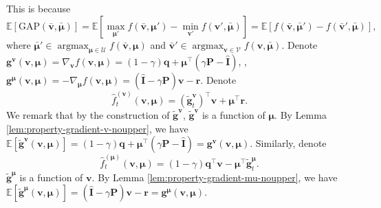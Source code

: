 \documentclass[12pt]{article}
\begin{document}
This is because
\begin{equation*}
    \mathbb{E}[\text{GAP}(\bar{\boldsymbol{v}},\bar{\boldsymbol{\mu}})] = \mathbb{E}[\max_{\boldsymbol{\mu}'} f(\bar{\boldsymbol{v}},\boldsymbol{\mu}') - \min_{\boldsymbol{v}'} f(\boldsymbol{v}',\bar{\boldsymbol{\mu}})] = \mathbb{E}[f(\bar{\boldsymbol{v}},\bar{\boldsymbol{\mu}}') - f(\bar{\boldsymbol{v}}',\bar{\boldsymbol{\mu}})],
\end{equation*}
where $\bar{\boldsymbol{\mu}}' \in \mathop{\arg\max}_{\boldsymbol{\mu} \in \mathcal{U}} f(\bar{\boldsymbol{v}},\boldsymbol{\mu})$ and $\bar{\boldsymbol{v}}' \in \mathop{\arg\max}_{\boldsymbol{v} \in \mathcal{V}} f(\boldsymbol{v},\bar{\boldsymbol{\mu}})$. Denote $\boldsymbol{g}^{\boldsymbol{v}}(\boldsymbol{v},\boldsymbol{\mu}) = \nabla_{\boldsymbol{v}} f(\boldsymbol{v},\boldsymbol{\mu}) = (1-\gamma) \boldsymbol{q} + \boldsymbol{\mu}^{\top} (\gamma \boldsymbol{\text{P}} - \hat{\boldsymbol{\text{I}}})$,
, $\boldsymbol{g}^{\boldsymbol{\mu}}(\boldsymbol{v},\boldsymbol{\mu}) = - \nabla_{\boldsymbol{\mu}} f(\boldsymbol{v},\boldsymbol{\mu})  = (\hat{\boldsymbol{\text{I}}} - \gamma \boldsymbol{\text{P}}) \boldsymbol{v} - \boldsymbol{\text{r}}$. Denote
\begin{equation*}
    \hat{f}_t^{(\boldsymbol{v})}(\boldsymbol{v},\boldsymbol{\mu}) = (\tilde{\boldsymbol{g}}^{\boldsymbol{v}}_t)^{\top} \boldsymbol{v} + \boldsymbol{\mu}^{\top} \boldsymbol{\text{r}}.
\end{equation*}
We remark that by the construction of $\tilde{\boldsymbol{g}}^{\boldsymbol{v}}$, $\tilde{\boldsymbol{g}}^{\boldsymbol{v}}$ is a function of $\boldsymbol{\mu}$. By Lemma \ref{lem:property-gradient-v-noupper}, we have $\mathbb{E}[\tilde{\boldsymbol{g}}^{\boldsymbol{v}}(\boldsymbol{v},\boldsymbol{\mu})] = (1-\gamma) \boldsymbol{q} + \boldsymbol{\mu}^{\top} (\gamma \boldsymbol{\text{P}} - \hat{\boldsymbol{\text{I}}}) = \boldsymbol{g}^{\boldsymbol{v}}(\boldsymbol{v},\boldsymbol{\mu})$. Similarly, denote
\begin{equation*}
    \hat{f}_t^{(\boldsymbol{\mu})}(\boldsymbol{v},\boldsymbol{\mu}) = (1 - \gamma) \boldsymbol{q}^{\top} \boldsymbol{v} - \boldsymbol{\mu}^{\top} \tilde{\boldsymbol{g}}^{\boldsymbol{\mu}}_t. 
\end{equation*}
$\tilde{\boldsymbol{g}}^{\boldsymbol{\mu}}$ is a function of $\boldsymbol{v}$. By Lemma \ref{lem:property-gradient-mu-noupper}, we have $\mathbb{E}[\tilde{\boldsymbol{g}}^{\boldsymbol{\mu}}(\boldsymbol{v},\boldsymbol{\mu})] = (\hat{\boldsymbol{\text{I}}} - \gamma \boldsymbol{\text{P}}) \boldsymbol{v} - \boldsymbol{\text{r}} = \boldsymbol{g}^{\boldsymbol{\mu}}(\boldsymbol{v},\boldsymbol{\mu})$.
\end{document}
